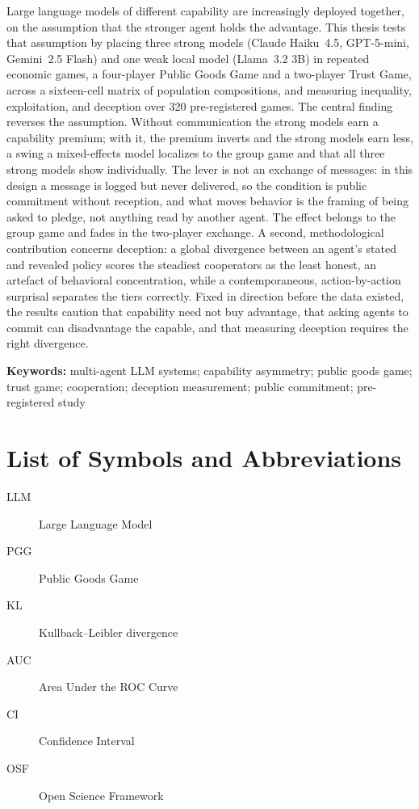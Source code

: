 Large language models of different capability are increasingly deployed together, on the
assumption that the stronger agent holds the advantage. This thesis tests that assumption by
placing three strong models (Claude Haiku~4.5, GPT-5-mini, Gemini~2.5 Flash) and one weak local
model (Llama~3.2 3B) in repeated economic games, a four-player Public Goods Game and a two-player
Trust Game, across a sixteen-cell matrix of population compositions, and measuring inequality,
exploitation, and deception over 320 pre-registered games. The central finding reverses the
assumption. Without communication the strong models earn a capability premium; with it, the
premium inverts and the strong models earn less, a swing a mixed-effects model localizes to the
group game and that all three strong models show individually. The lever is not an exchange of
messages: in this design a message is logged but never delivered, so the condition is public
commitment without reception, and what moves behavior is the framing of being asked to pledge, not
anything read by another agent. The effect belongs to the group game and fades in the two-player
exchange. A second, methodological contribution concerns deception: a global divergence between an
agent's stated and revealed policy scores the steadiest cooperators as the least honest, an
artefact of behavioral concentration, while a contemporaneous, action-by-action surprisal
separates the tiers correctly. Fixed in direction before the data existed, the results caution
that capability need not buy advantage, that asking agents to commit can disadvantage the capable,
and that measuring deception requires the right divergence.

\vspace{1em}\noindent\textbf{Keywords:} multi-agent LLM systems; capability asymmetry; public
goods game; trust game; cooperation; deception measurement; public commitment; pre-registered
study

\tableofcontents
\listoffigures
\listoftables

\chapter*{List of Symbols and Abbreviations}
\begin{description}
  \item[LLM] Large Language Model
  \item[PGG] Public Goods Game
  \item[KL] Kullback--Leibler divergence
  \item[AUC] Area Under the ROC Curve
  \item[CI] Confidence Interval
  \item[OSF] Open Science Framework
\end{description}

